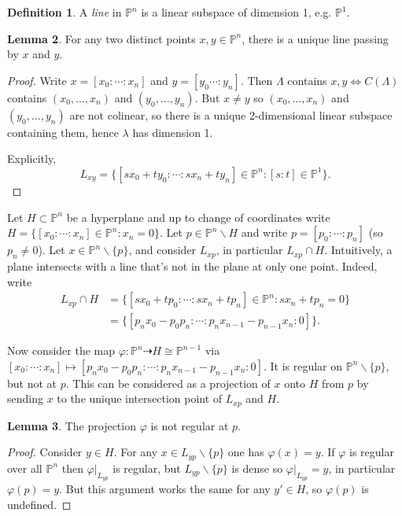 \documentclass{article}
\newcommand{\p}{\mathbb{P}}
\theoremstyle{definition}
\newtheorem{defn}{Definition}[subsection]
\newtheorem{lemma}[defn]{Lemma}
\begin{document}
\begin{defn}
A \textit{line} in $\p^n$ is a linear subspace of dimension 1, e.g. $\p^1$.
\end{defn}

\begin{lemma}
For any two distinct points $x,y\in\p^n$, there is a unique line passing by $x$ and $y$.
\end{lemma}
\begin{proof}
Write $x=[x_0:\cdots:x_n]$ and $y=[y_0\cdots:y_n]$. Then $\Lambda$ contains $x,y\iff C(\Lambda)$ contains $(x_0,\ldots,x_n)$ and $(y_0,\ldots,y_n)$. But $x\neq y$ so $(x_0,\ldots,x_n)$ and $(y_0,\ldots,y_n)$ are not colinear, so there is a unique 2-dimensional linear subspace containing them, hence $\lambda$ has dimension 1.

Explicitly,
\[
L_{xy}=\{[sx_0+ty_0:\cdots:sx_n+ty_n]\in\p^n:[s:t]\in\p^1\}.
\]
\end{proof}

Let $H\subset\p^n$ be a hyperplane and up to change of coordinates write $H=\{[x_0:\cdots:x_n]\in\p^n:x_n=0\}$. Let $p\in\p^n\backslash H$ and write $p=[p_0:\cdots:p_n]$ (so $p_n\neq 0$). Let $x\in\p^n\backslash\{p\}$, and consider $L_{xp}$, in particular $L_{xp}\cap H$. Intuitively, a plane intersects with a line that's not in the plane at only one point. Indeed, write
\[
\begin{aligned}
L_{xp}\cap H&=\{[sx_0+tp_0:\cdots:sx_n+tp_n]\in\p^n:sx_n+tp_n=0\} \\
&=\{[p_nx_0-p_0p_n:\cdots:p_nx_{n-1}-p_{n-1}x_n:0]\}.
\end{aligned}
\]

Now consider the map $\varphi:\p^n\dashrightarrow H\cong\p^{n-1}$ via $[x_0:\cdots:x_n]\mapsto [p_nx_0-p_0p_n:\cdots:p_nx_{n-1}-p_{n-1}x_n:0]$. It is regular on $\p^n\backslash\{p\}$, but not at $p$. This can be considered as a projection of $x$ onto $H$ from $p$ by sending $x$ to the unique intersection point of $L_{xp}$ and $H$.

\begin{lemma}
The projection $\varphi$ is not regular at $p$.
\end{lemma}
\begin{proof}
Consider $y\in H$. For any $x\in L_{yp}\backslash\{p\}$ one has $\varphi(x)=y$. If $\varphi$ is regular over all $\p^n$ then $\left.\varphi\right|_{L_{yp}}$ is regular, but $L_{yp}\backslash\{p\}$ is dense so $\left.\varphi\right|_{L_{yp}}=y$, in particular $\varphi(p)=y$. But this argument works the same for any $y'\in H$, so $\varphi(p)$ is undefined.
\end{proof}
\end{document}
